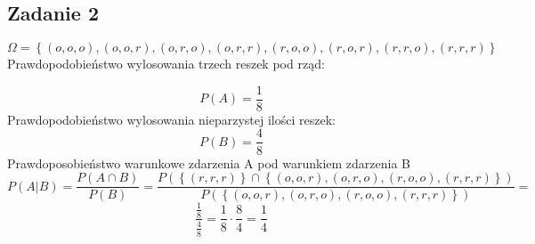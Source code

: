 \subsection{Zadanie 2}

\[ \Omega =\left \{(o,o,o),(o,o,r),(o,r,o),(o,r,r),(r,o,o),(r,o,r),(r,r,o),(r,r,r) \right \} \] 
Prawdopodobieństwo wylosowania trzech reszek pod rząd:

\[ P\left(A\right)= \frac{1}{8} \] 
Prawdopodobieństwo wylosowania nieparzystej ilości reszek:
\[ P\left(B\right)= \frac{4}{8} \] 
Prawdoposobieństwo warunkowe zdarzenia A pod warunkiem zdarzenia B
\[P\left(A|B\right) = \frac{P\left(A \cap B\right)}{P\left( B\right)} = \frac{ P \left(\left \{(r,r,r) \right \} \cap \left \{(o,o,r),(o,r,o),(r,o,o),(r,r,r) \right \}\right)}{ P \left( \left \{(o,o,r),(o,r,o),(r,o,o),(r,r,r) \right \}\right)} = \] 
\[  \frac{\frac{1}{8}}{\frac{4}{8}} = \frac{1}{8} \cdot \frac{8}{4} = \frac{1}{4} \] 

